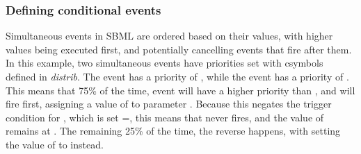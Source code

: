 \documentclass[draftspec]{sbmlpkgspec}
\newcommand{\distribshort}{\emph{distrib}\xspace}
\begin{document}
\subsubsection{Defining conditional events}

Simultaneous events in SBML are ordered based on their \Priority values, with higher values being executed first, and potentially cancelling events that fire after them.  In this example, two simultaneous events have priorities set with csymbols defined in \distribshort.  The event  has a priority of , while the event  has a priority of .  This means that 75\% of the time, event  will have a higher priority than , and will fire first, assigning a value of  to parameter .  Because this negates the trigger condition for , which is set =, this means that  never fires, and the value of  remains at .  The remaining 25\% of the time, the reverse happens, with  setting the value of  to  instead.
\end{document}

